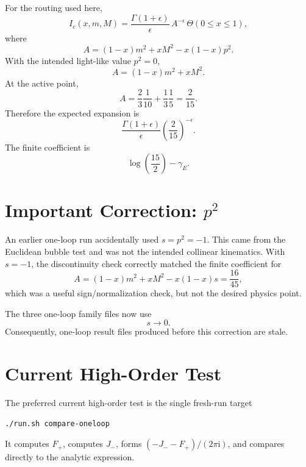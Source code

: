 \documentclass[11pt]{article}
\newcommand{\ii}{\mathrm{i}}
\newcommand{\eps}{\epsilon}
\begin{document}
For the routing used here,
\begin{equation}
  I_c(x,m,M)
  =
  \frac{\Gamma(1+\eps)}{\eps}\,
  A^{-\eps}\,
  \Theta(0\le x\le 1),
\end{equation}
where
\begin{equation}
  A=(1-x)m^2+xM^2-x(1-x)p^2.
\end{equation}
With the intended light-like value \(p^2=0\),
\begin{equation}
  A=(1-x)m^2+xM^2.
\end{equation}
At the active point,
\begin{equation}
  A=\frac23\frac{1}{10}+\frac13\frac15=\frac{2}{15}.
\end{equation}
Therefore the expected expansion is
\begin{equation}
  \frac{\Gamma(1+\eps)}{\eps}
  \left(\frac{2}{15}\right)^{-\eps}.
\end{equation}
The finite coefficient is
\begin{equation}
  \log\!\left(\frac{15}{2}\right)-\gamma_E.
\end{equation}

\section{Important Correction: \(p^2\)}

An earlier one-loop run accidentally used \(s=p^2=-1\). This came from the
Euclidean bubble test and was not the intended collinear kinematics. With
\(s=-1\), the discontinuity check correctly matched the finite coefficient for
\begin{equation}
  A=(1-x)m^2+xM^2-x(1-x)s=\frac{16}{45},
\end{equation}
which was a useful sign/normalization check, but not the desired physics point.

The three one-loop family files now use
\begin{equation}
  s\to 0.
\end{equation}
Consequently, one-loop result files produced before this correction are stale.

\section{Current High-Order Test}

The preferred current high-order test is the single fresh-run target
\begin{verbatim}
./run.sh compare-oneloop
\end{verbatim}
It computes \(F_+\), computes \(J_-\), forms
\((-J_--F_+)/(2\pi\ii)\), and compares directly to the analytic expression.
\end{document}
